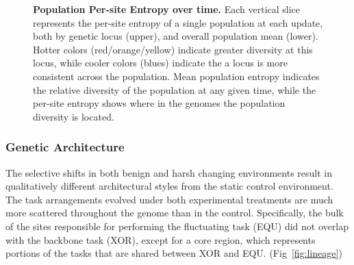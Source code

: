 \documentclass[10pt,letterpaper]{article}
\begin{document}
\begin{figure}[!h]
\caption{{\bf Population Per-site Entropy over time.} Each vertical slice represents the per-site entropy of %
a single
population at each update, both by genetic locus (upper), and overall population mean (lower). Hotter colors (red/orange/yellow) indicate greater diversity at this locus, while cooler colors (blues) indicate the a locus is more consistent across the population. Mean population entropy indicates the relative diversity of the population at any given time, while the per-site entropy shows where in the genomes the population diversity is located.   %
}\label{fig:entropy}
\end{figure}


\subsubsection*{Genetic Architecture}
The selective shifts in both benign and harsh changing environments result in qualitatively different architectural styles from the static control environment. The task arrangements evolved under both experimental treatments are much more scattered throughout the genome than in the control. Specifically, the bulk of the sites responsible for performing the fluctuating task (EQU) did not overlap with the backbone task (XOR), except for a core region, which represents portions of the tasks that are shared between XOR and EQU. (Fig~\ref{fig:lineage})
\end{document}
